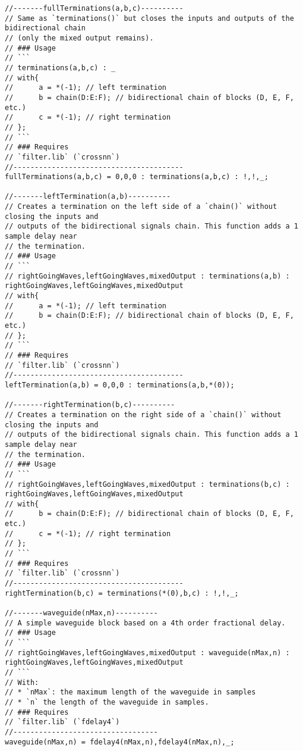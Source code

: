 \begin{lstlisting}
//-------fullTerminations(a,b,c)----------
// Same as `terminations()` but closes the inputs and outputs of the bidirectional chain
// (only the mixed output remains).
// ### Usage
// ```
// terminations(a,b,c) : _
// with{
//		a = *(-1); // left termination
//		b = chain(D:E:F); // bidirectional chain of blocks (D, E, F, etc.)
//		c = *(-1); // right termination
// };
// ```  
// ### Requires
// `filter.lib` (`crossnn`)
//----------------------------------------
fullTerminations(a,b,c) = 0,0,0 : terminations(a,b,c) : !,!,_;

//-------leftTermination(a,b)----------
// Creates a termination on the left side of a `chain()` without closing the inputs and 
// outputs of the bidirectional signals chain. This function adds a 1 sample delay near
// the termination.
// ### Usage
// ```
// rightGoingWaves,leftGoingWaves,mixedOutput : terminations(a,b) : rightGoingWaves,leftGoingWaves,mixedOutput
// with{
//		a = *(-1); // left termination
//		b = chain(D:E:F); // bidirectional chain of blocks (D, E, F, etc.)
// };
// ```  
// ### Requires
// `filter.lib` (`crossnn`)
//----------------------------------------
leftTermination(a,b) = 0,0,0 : terminations(a,b,*(0));

//-------rightTermination(b,c)----------
// Creates a termination on the right side of a `chain()` without closing the inputs and 
// outputs of the bidirectional signals chain. This function adds a 1 sample delay near
// the termination.
// ### Usage
// ```
// rightGoingWaves,leftGoingWaves,mixedOutput : terminations(b,c) : rightGoingWaves,leftGoingWaves,mixedOutput
// with{
//		b = chain(D:E:F); // bidirectional chain of blocks (D, E, F, etc.)
//		c = *(-1); // right termination
// };
// ```  
// ### Requires
// `filter.lib` (`crossnn`)
//----------------------------------------
rightTermination(b,c) = terminations(*(0),b,c) : !,!,_;

//-------waveguide(nMax,n)----------
// A simple waveguide block based on a 4th order fractional delay.
// ### Usage
// ```
// rightGoingWaves,leftGoingWaves,mixedOutput : waveguide(nMax,n) : rightGoingWaves,leftGoingWaves,mixedOutput
// ```
// With: 
// * `nMax`: the maximum length of the waveguide in samples
// * `n` the length of the waveguide in samples. 
// ### Requires
// `filter.lib` (`fdelay4`)
//----------------------------------
waveguide(nMax,n) = fdelay4(nMax,n),fdelay4(nMax,n),_;


\end{lstlisting}
